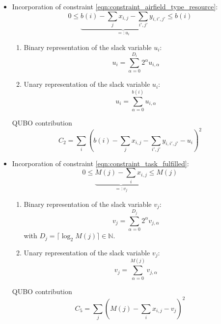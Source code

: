 \documentclass{article}
\begin{document}
\begin{itemize}
\item Incorporation of constraint \eqref{eqn:constraint_airfield_type_resource}:
    \begin{equation*}
        0 \leq \underbrace{b(i) - \sum_j x_{i,j} - \sum_{i', j'} y_{i, i', j'}}_{=:u_i} \leq b(i)
    \end{equation*}
    \begin{enumerate}
        \item 
        Binary representation of the slack variable $u_i$:
        \begin{equation*}
            u_{i} = \sum_{\alpha = 0}^{D_i} 2^\alpha u_{i, \alpha}
        \end{equation*}
        \item 
        Unary representation of the slack variable $u_i$:
        \begin{equation*}
            u_{i} = \sum_{\alpha = 0}^{b(i)} u_{i, \alpha}
        \end{equation*}
    \end{enumerate}
    QUBO contribution
    \begin{equation*}
        C_2 = \sum_i \left( b(i) - \sum_j x_{i,j} - \sum_{i', j'} y_{i, i', j'} - u_i \right)^2
    \end{equation*}
\item Incorporation of constraint \eqref{eqn:constraint_task_fulfilled}:
    \begin{equation*}
        0 \leq \underbrace{M(j) - \sum_i x_{i,j}}_{=:v_j} \leq M(j)
    \end{equation*}
    \begin{enumerate}
        \item 
        Binary representation of the slack variable $v_j$:
        \begin{equation*}
            v_{j} = \sum_{\alpha = 0}^{D_j} 2^\alpha v_{j, \alpha} 
        \end{equation*}
        with $D_j = \lceil \log_2 M(j) \rceil \in \mathbb{N}$.
        \item 
        Unary representation of the slack variable $v_j$:
        \begin{equation*}
            v_{j} = \sum_{\alpha = 0}^{M(j)} v_{j, \alpha}
        \end{equation*}
    \end{enumerate}
    QUBO contribution
    \begin{equation*}
        C_5 = \sum_j \left( M(j) - \sum_i x_{i,j} -  v_j \right)^2

\end{equation*}
\end{itemize}
\end{document}
